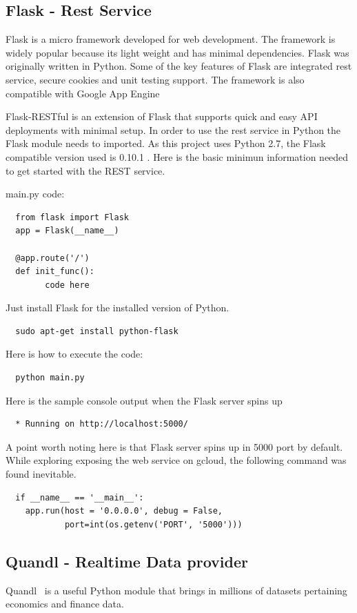 \subsection{Flask - Rest Service}
Flask is a micro framework developed for web development. The framework is
widely popular because its light weight and has minimal dependencies. Flask
was originally written in Python. Some of the key features of Flask are
integrated rest service, secure cookies and unit testing support. The
framework is also compatible with Google App
Engine~\cite{hid-sp18-417-google_appengine}

Flask-RESTful is an extension of Flask that supports quick and easy API
deployments with minimal setup. In order to use the rest service in Python the
Flask module needs to imported. As this project uses Python 2.7, the Flask
compatible version used is 0.10.1 . Here is the basic minimun information
needed to get started with the REST service.

main.py code:

\begin{verbatim}
  from flask import Flask
  app = Flask(__name__)

  @app.route('/')
  def init_func():
        code here
\end{verbatim}

Just install Flask for the installed version of Python.

\begin{verbatim}
  sudo apt-get install python-flask
\end{verbatim}

Here is how to execute the code:
\begin{verbatim}
  python main.py
\end{verbatim}

Here is the sample console output when the Flask server spins up

\begin{verbatim}
  * Running on http://localhost:5000/
\end{verbatim}
A point worth noting here is that Flask server spins up in 5000 port by
default. While exploring exposing the web service on gcloud, the following
command was found inevitable.

\begin{verbatim}
  if __name__ == '__main__':
    app.run(host = '0.0.0.0', debug = False, 
            port=int(os.getenv('PORT', '5000')))
\end{verbatim}

\subsection{Quandl - Realtime Data provider}
Quandl~\cite{hid-sp18-417-Quandl} is a useful Python module that brings in
millions of datasets pertaining economics and finance data. 

